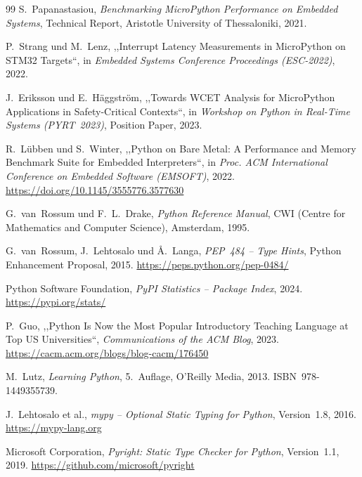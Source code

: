 ﻿\documentclass[12pt,a4paper,twoside]{article}
\newcommand{\doi}[1]{\url{https://doi.org/#1}}
\begin{document}
\begin{thebibliography}{99}
  S.~Papanastasiou,
  \textit{Benchmarking MicroPython Performance on Embedded Systems},
  Technical Report, Aristotle University of Thessaloniki, 2021.

  P.~Strang und M.~Lenz,
  ,,Interrupt Latency Measurements in MicroPython on STM32 Targets``,
  in \textit{Embedded Systems Conference Proceedings (ESC-2022)}, 2022.

  J.~Eriksson und E.~Häggström,
  ,,Towards WCET Analysis for MicroPython Applications in Safety-Critical Contexts``,
  in \textit{Workshop on Python in Real-Time Systems (PYRT~2023)},
  Position Paper, 2023.

  R.~Lübben und S.~Winter,
  ,,Python on Bare Metal: A Performance and Memory Benchmark Suite
  for Embedded Interpreters``,
  in \textit{Proc. ACM International Conference on Embedded Software (EMSOFT)}, 2022.
  \doi{10.1145/3555776.3577630}

  G.~van~Rossum und F.~L.~Drake,
  \textit{Python Reference Manual},
  CWI (Centre for Mathematics and Computer Science),
  Amsterdam, 1995.

  G.~van~Rossum, J.~Lehtosalo und Å.~Langa,
  \textit{PEP~484 -- Type Hints},
  Python Enhancement Proposal, 2015.
  \url{https://peps.python.org/pep-0484/}

  {Python Software Foundation},
  \textit{PyPI Statistics -- Package Index}, 2024.
  \url{https://pypi.org/stats/}

  P.~Guo,
  ,,Python Is Now the Most Popular Introductory Teaching Language
  at Top US Universities``,
  \textit{Communications of the ACM Blog}, 2023.
  \url{https://cacm.acm.org/blogs/blog-cacm/176450}

  M.~Lutz,
  \textit{Learning Python},
  5.~Auflage, O'Reilly Media, 2013.
  ISBN~978-1449355739.


  J.~Lehtosalo et al.,
  \textit{mypy -- Optional Static Typing for Python},
  Version~1.8, 2016.
  \url{https://mypy-lang.org}

  {Microsoft Corporation},
  \textit{Pyright: Static Type Checker for Python},
  Version~1.1, 2019.
  \url{https://github.com/microsoft/pyright}


\end{thebibliography}
\end{document}
